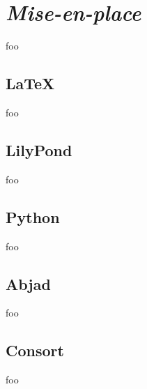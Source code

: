 \chapter{\emph{Mise-en-place}}

foo

\section{LaTeX}

foo

\section{LilyPond}

foo

\section{Python}

foo

\section{Abjad}

foo

\section{Consort}

foo